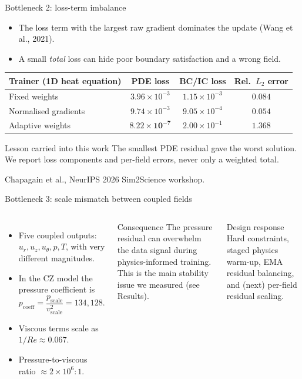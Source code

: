 \documentclass[aspectratio=169]{beamer}
\begin{document}
\begin{frame}{Bottleneck 2: loss-term imbalance}
\begin{itemize}
  \item The loss term with the largest raw gradient dominates the update (Wang et al., 2021).
  \item A small \emph{total} loss can hide poor boundary satisfaction and a wrong field.
\end{itemize}
\vspace{0.1cm}
\begin{center}
\small
\begin{tabular}{lccc}
\toprule
Trainer (1D heat equation) & PDE loss & BC/IC loss & Rel.\ $L_2$ error \\
\midrule
Fixed weights            & $3.96\times10^{-3}$ & $1.15\times10^{-3}$ & $0.084$ \\
Normalised gradients     & $9.74\times10^{-3}$ & $9.05\times10^{-4}$ & $\mathbf{0.054}$ \\
Adaptive weights         & $\mathbf{8.22\times10^{-7}}$ & $2.00\times10^{-1}$ & $1.368$ \\
\bottomrule
\end{tabular}
\end{center}
\vspace{0.1cm}
\begin{block}{Lesson carried into this work}
The smallest PDE residual gave the worst solution. We report loss components and per-field errors, never only a weighted total.
\end{block}
\smallskip
{\scriptsize Chapagain et al., NeurIPS 2026 Sim2Science workshop.}
\end{frame}

\begin{frame}{Bottleneck 3: scale mismatch between coupled fields}
\begin{columns}[T,onlytextwidth]
\begin{itemize}
  \item Five coupled outputs: $u_r, u_z, u_\theta, p, T$, with very different magnitudes.
  \item In the CZ model the pressure coefficient is
  \[p_{\mathrm{coeff}} = \frac{p_{\mathrm{scale}}}{v_{\mathrm{scale}}^2} = 134{,}128.\]
  \item Viscous terms scale as $1/Re \approx 0.067$.
  \item Pressure-to-viscous ratio $\approx 2\times10^{6}:1$.
\end{itemize}
\begin{alertblock}{Consequence}
The pressure residual can overwhelm the data signal during physics-informed training. This is the main stability issue we measured (see Results).
\end{alertblock}
\vspace{0.2cm}
\begin{block}{Design response}
Hard constraints, staged physics warm-up, EMA residual balancing, and (next) per-field residual scaling.
\end{block}
\end{columns}
\end{frame}
\end{document}
